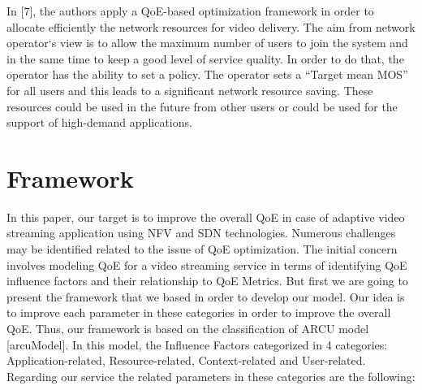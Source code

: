 \documentclass[a4paper]{article}
\begin{document}
In [7], the authors apply a QoE-based optimization framework in order to allocate efficiently the network resources for video delivery. The aim from network operator`s view is to allow the maximum number of users to join the system and in the same time to keep a good level of service quality. In order to do that, the operator has the ability to set a policy. The operator sets a “Target mean MOS” for all users and this leads to a significant network resource saving. These resources could be used in the future from other users or could be used for the support of high-demand applications. \\

\section{Framework}
In this paper, our target is to improve the overall QoE in case of adaptive video streaming application using NFV and SDN technologies. 
Numerous challenges may be identified related to the issue of QoE optimization. The initial concern involves modeling QoE for a video streaming service in terms of identifying QoE influence factors and their relationship to QoE Metrics. But first we are going to present the framework that we based in order to develop our model. Our idea is to improve each parameter in these categories in order to improve the overall QoE. Thus, our framework is based on the classification of ARCU model [arcuModel]. 
In this model, the Influence Factors  categorized in 4 categories: Application-related, Resource-related, Context-related and User-related. Regarding our service the related parameters in these categories are the following: 
\end{document}
